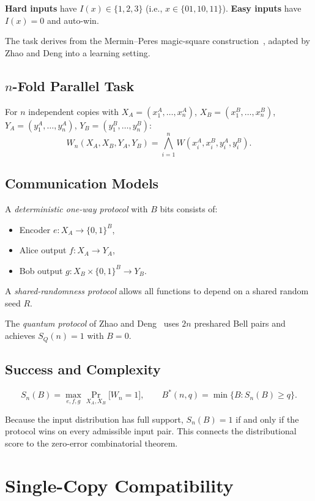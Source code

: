 \documentclass[11pt,letterpaper]{article}
\newcommand{\Bstar}{B^{\!*}}
\begin{document}
\textbf{Hard inputs} have $I(x) \in \{1,2,3\}$ (i.e., $x \in \{01,10,11\}$). \textbf{Easy inputs} have $I(x)=0$ and auto-win.

The task derives from the Mermin--Peres magic-square construction~\cite{mermin1990,peres1990}, adapted by Zhao and Deng into a learning setting.

\subsection{$n$-Fold Parallel Task}

For $n$ independent copies with $X_A = (x_1^A,\ldots,x_n^A)$, $X_B = (x_1^B,\ldots,x_n^B)$, $Y_A = (y_1^A,\ldots,y_n^A)$, $Y_B = (y_1^B,\ldots,y_n^B)$:
\[
  W_n(X_A, X_B, Y_A, Y_B) = \bigwedge_{i=1}^{n} W(x_i^A, x_i^B, y_i^A, y_i^B).
\]

\subsection{Communication Models}

A \emph{deterministic one-way protocol} with $B$ bits consists of:
\begin{itemize}[leftmargin=*,itemsep=1pt]
  \item Encoder $e : X_A \to \{0,1\}^B$,
  \item Alice output $f : X_A \to Y_A$,
  \item Bob output $g : X_B \times \{0,1\}^B \to Y_B$.
\end{itemize}

A \emph{shared-randomness protocol} allows all functions to depend on a shared random seed $R$.

The \emph{quantum protocol} of Zhao and Deng~\cite{zhaodeng2025} uses $2n$ preshared Bell pairs and achieves $S_Q(n)=1$ with $B=0$.

\subsection{Success and Complexity}

\[
  S_n(B) = \max_{e,f,g} \Pr_{X_A,X_B}\bigl[W_n = 1\bigr], \qquad
  \Bstar(n,q) = \min\{B : S_n(B) \geq q\}.
\]

Because the input distribution has full support, $S_n(B)=1$ if and only if the protocol wins on every admissible input pair. This connects the distributional score to the zero-error combinatorial theorem.

\section{Single-Copy Compatibility}
\label{sec:single}
\end{document}
